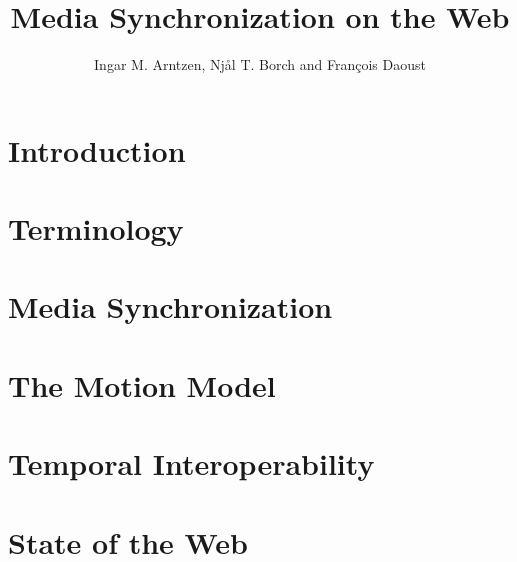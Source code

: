 \documentclass[graybox]{svmult}
\begin{document}
\title*{Media Synchronization on the Web}
\author{Ingar M. Arntzen, Nj{\aa}l T. Borch and Fran\c{c}ois Daoust}

\maketitle

\abstract{

}

\section{Introduction}
\label{sec:intro}


\section{Terminology}
\label{sec:terms}


\section{Media Synchronization}
\label{sec:mediasync}


\section{The Motion Model}
\label{sec:model}


\section{Temporal Interoperability}
\label{sec:interoperability}


\section{State of the Web}
\label{sec:web}

\end{document}
